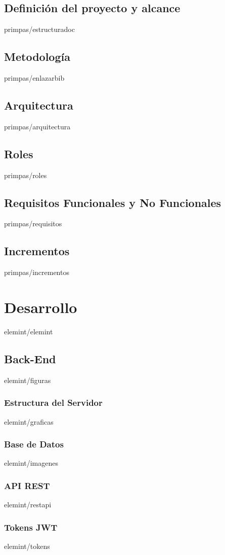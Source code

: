 \documentclass[epsbased,copyright,final,printable,covers,extendedindex,firstnumbered,tfg,gnuplot]{tfgtfmthesisuam}
\begin{document}
  \section{Definición del proyecto y alcance\label{SEC:ESTRUCTURAR}}{primpas/estructuradoc}
  \section{Metodología\label{SEC:ENLAZBIBLIOGRAFIA}}{primpas/enlazarbib}
  \section{Arquitectura\label{SEC:ARQUITECTURA}}{primpas/arquitectura}
  \section{Roles\label{SEC:ROLES}}{primpas/roles}
  \section{Requisitos Funcionales y No Funcionales\label{SEC:REQUISITOS}}{primpas/requisitos}
  \section{Incrementos\label{SEC:INCREMENTOS}}{primpas/incrementos}

\chapter{Desarrollo\label{CAP:ELEMINT}}{elemint/elemint}
  \section{Back-End\label{SEC:FIGURAS}}{elemint/figuras}
    \subsection{Estructura del Servidor\label{SS:GRAFICAS}}{elemint/graficas}
    \subsection{Base de Datos\label{SS:INMAGENES}}{elemint/imagenes}
    \subsection{API REST\label{SS:RESTAPI}}{elemint/restapi}
    \subsection{Tokens JWT\label{SS:TOKENS}}{elemint/tokens}
\end{document}
